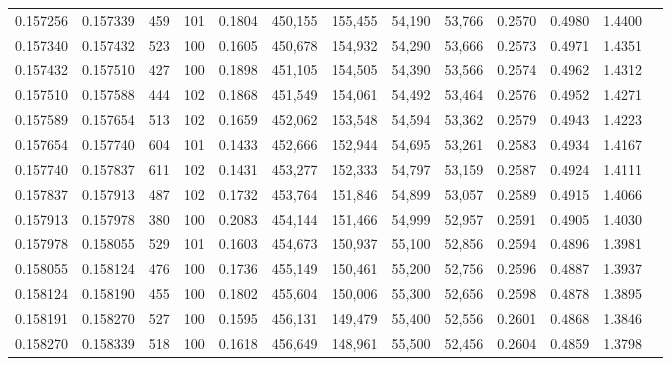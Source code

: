 \begin{tabular}{rrrrrrrrrrrrr}
0.157256 & 0.157339 &   459 & 101 &                                     0.1804 & 450,155 & 155,455 &  54,190 &  53,766 & 0.2570 & 0.4980 & 1.4400 \\
0.157340 & 0.157432 &   523 & 100 &                                     0.1605 & 450,678 & 154,932 &  54,290 &  53,666 & 0.2573 & 0.4971 & 1.4351 \\
0.157432 & 0.157510 &   427 & 100 &                                     0.1898 & 451,105 & 154,505 &  54,390 &  53,566 & 0.2574 & 0.4962 & 1.4312 \\
0.157510 & 0.157588 &   444 & 102 &                                     0.1868 & 451,549 & 154,061 &  54,492 &  53,464 & 0.2576 & 0.4952 & 1.4271 \\
0.157589 & 0.157654 &   513 & 102 &                                     0.1659 & 452,062 & 153,548 &  54,594 &  53,362 & 0.2579 & 0.4943 & 1.4223 \\
0.157654 & 0.157740 &   604 & 101 &                                     0.1433 & 452,666 & 152,944 &  54,695 &  53,261 & 0.2583 & 0.4934 & 1.4167 \\
0.157740 & 0.157837 &   611 & 102 &                                     0.1431 & 453,277 & 152,333 &  54,797 &  53,159 & 0.2587 & 0.4924 & 1.4111 \\
0.157837 & 0.157913 &   487 & 102 &                                     0.1732 & 453,764 & 151,846 &  54,899 &  53,057 & 0.2589 & 0.4915 & 1.4066 \\
0.157913 & 0.157978 &   380 & 100 &                                     0.2083 & 454,144 & 151,466 &  54,999 &  52,957 & 0.2591 & 0.4905 & 1.4030 \\
0.157978 & 0.158055 &   529 & 101 &                                     0.1603 & 454,673 & 150,937 &  55,100 &  52,856 & 0.2594 & 0.4896 & 1.3981 \\
0.158055 & 0.158124 &   476 & 100 &                                     0.1736 & 455,149 & 150,461 &  55,200 &  52,756 & 0.2596 & 0.4887 & 1.3937 \\
0.158124 & 0.158190 &   455 & 100 &                                     0.1802 & 455,604 & 150,006 &  55,300 &  52,656 & 0.2598 & 0.4878 & 1.3895 \\
0.158191 & 0.158270 &   527 & 100 &                                     0.1595 & 456,131 & 149,479 &  55,400 &  52,556 & 0.2601 & 0.4868 & 1.3846 \\
0.158270 & 0.158339 &   518 & 100 &                                     0.1618 & 456,649 & 148,961 &  55,500 &  52,456 & 0.2604 & 0.4859 & 1.3798 \\

\end{tabular}

